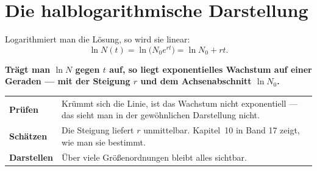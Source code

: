 \section{Die halblogarithmische Darstellung}

\begin{merksatz}
Logarithmiert man die Lösung, so wird sie linear:
\[ \ln N(t) = \ln\bigl(N_0e^{rt}\bigr) = \ln N_0 + rt . \]

\begin{center}
\begin{minipage}{0.9\textwidth}
\textbf{Trägt man $\ln N$ gegen $t$ auf, so liegt exponentielles Wachstum auf einer Geraden --- mit der Steigung $r$ und dem Achsenabschnitt $\ln N_0$.}
\end{minipage}
\end{center}

\begin{center}
\end{center}

\begin{center}
\renewcommand{\arraystretch}{1.5}
\begin{tabular}{@{}P{2.4cm}P{6.2cm}@{}}
\toprule
\textbf{Prüfen} & Krümmt sich die Linie, ist das Wachstum nicht exponentiell --- das sieht man in der gewöhnlichen Darstellung nicht.\\
\textbf{Schätzen} & Die Steigung liefert $r$ unmittelbar. Kapitel~10 in Band 17 zeigt, wie man sie bestimmt.\\
\textbf{Darstellen} & Über viele Größenordnungen bleibt alles sichtbar.\\
\bottomrule
\end{tabular}
\end{center}


\end{merksatz}
